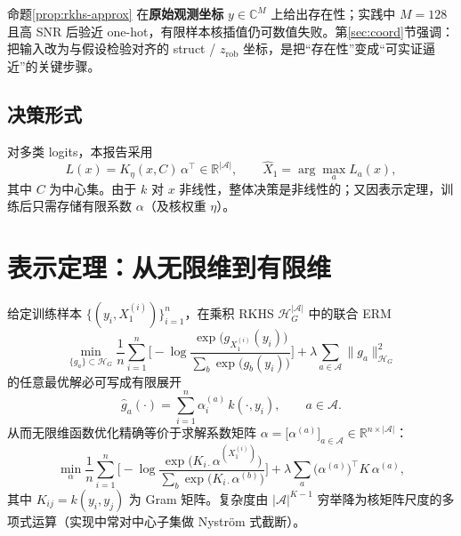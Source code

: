 \begin{remark}
命题\ref{prop:rkhs-approx} 在\textbf{原始观测坐标} $y\in\mathbb{C}^{M}$ 上给出存在性；实践中 $M=128$ 且高 SNR 后验近 one-hot，有限样本核插值仍可数值失败。第\ref{sec:coord}节强调：把输入改为与假设检验对齐的 struct / $z_{\mathrm{rob}}$ 坐标，是把“存在性”变成“可实证逼近”的关键步骤。
\end{remark}

\subsection{决策形式}
对多类 logits，本报告采用
\begin{equation}
L(x)=K_\eta(x,C)\,\alpha^\top\in\mathbb{R}^{|\mathcal{A}|},\qquad
\hat X_1=\arg\max_a L_a(x),
\end{equation}
其中 $C$ 为中心集。由于 $k$ 对 $x$ 非线性，整体决策是非线性的；又因表示定理，训练后只需存储有限系数 $\alpha$（及核权重 $\eta$）。

\section{表示定理：从无限维到有限维}

\begin{theorem}
\label{thm:representer}
给定训练样本 $\{(y_i,X_1^{(i)})\}_{i=1}^n$，在乘积 RKHS $\mathcal{H}_G^{|\mathcal{A}|}$ 中的联合 ERM
\begin{equation}
\min_{\{g_a\}\subset\mathcal{H}_G}
\frac1n\sum_{i=1}^n
\Big[
-\log\frac{\exp\big(g_{X_1^{(i)}}(y_i)\big)}{\sum_b\exp\big(g_b(y_i)\big)}
\Big]
+\lambda\sum_{a\in\mathcal{A}}\|g_a\|_{\mathcal{H}_G}^2
\end{equation}
的任意最优解必可写成有限展开\cite{scholkopf2001,schafer2006}
\begin{equation}
\hat g_a(\cdot)=\sum_{i=1}^n \alpha_i^{(a)}\,k(\cdot,y_i),\qquad a\in\mathcal{A}.
\end{equation}
从而无限维函数优化精确等价于求解系数矩阵
$\alpha=\big[\alpha^{(a)}\big]_{a\in\mathcal{A}}\in\mathbb{R}^{n\times|\mathcal{A}|}$：
\begin{equation}
\min_{\alpha}
\frac1n\sum_{i=1}^n
\Big[
-\log\frac{\exp\big(K_{i\cdot}\alpha^{(X_1^{(i)})}\big)}{\sum_b\exp\big(K_{i\cdot}\alpha^{(b)}\big)}
\Big]
+\lambda\sum_a \big(\alpha^{(a)}\big)^\top K\,\alpha^{(a)},
\label{eq:finite-erm}
\end{equation}
其中 $K_{ij}=k(y_i,y_j)$ 为 Gram 矩阵。复杂度由 $|\mathcal{A}|^{K-1}$ 穷举降为核矩阵尺度的多项式运算（实现中常对中心子集做 Nystr\"om 式截断）。
\end{theorem}

